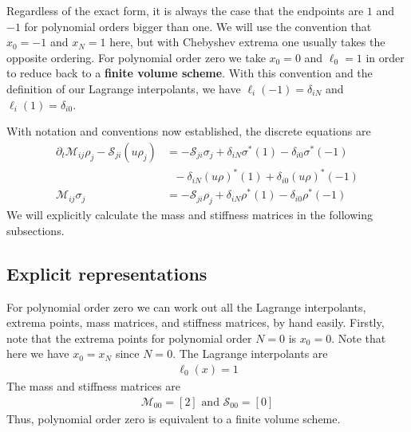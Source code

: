 \documentclass{report}
\numberwithin{equation}{section}
\begin{document}
Regardless of the exact form, it is always the case that the endpoints are $1$ and $-1$ for polynomial orders bigger than one. We will use the convention that $x_0 = -1$ and $x_N = 1$ here, but with Chebyshev extrema one usually takes the opposite ordering. For polynomial order zero we take $x_0 = 0$ and $\ell_0 = 1$ in order to reduce back to a \textbf{finite volume scheme}. With this convention and the definition of our Lagrange interpolants, we have $\ell_i(-1) = \delta_{iN}$ and $\ell_i(1) = \delta_{i0}$.

With notation and conventions now established, the discrete equations are
\begin{align}
    \label{discrete_form_1}
    \partial_t \mathcal{M}_{ij} \rho_j - \mathcal{S}_{ji} (u \rho_j) &= 
    - \mathcal{S}_{ji} \sigma_j
    + \delta_{iN} \sigma^*(1) 
    - \delta_{i0} \sigma^*(-1)
    \\
    \nonumber
    &\text{ } - \delta_{iN} (u \rho)^*(1) 
    +  
    \delta_{i0} (u \rho)^*(-1)
    \\
    \label{discrete_form_2}
    \mathcal{M}_{ij} \sigma_j &= -  \mathcal{S}_{ji}\rho_j
    + \delta_{iN} \rho^*(1) 
    -
    \delta_{i0} \rho^*(-1)
\end{align}
We will explicitly calculate the mass and stiffness matrices in the following subsections.

\subsection{Explicit representations}
For polynomial order zero we can work out all the Lagrange interpolants, extrema points, mass matrices, and stiffness matrices, by hand easily. Firstly, note that the extrema points for polynomial order $N=0$ is $x_0 = 0$. Note that here we have $x_0 = x_N$ since $N = 0$. The Lagrange interpolants are
\begin{align}
    \ell_0(x) = 1
\end{align}
The mass and stiffness matrices are 
\begin{align}
    \mathcal{M}_{00} = [2] \text{ and } \mathcal{S}_{00} = [0]
\end{align}
Thus, polynomial order zero is equivalent to a finite volume scheme.
\end{document}
